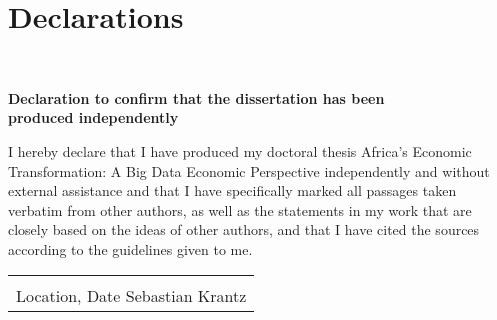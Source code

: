 \documentclass[openany]{book}
\begin{document}
%
%
%
%
%
%
%
%
%
%
%
%
%
%


\newpage
\chapter[Declarations]{Declarations}
\thispagestyle{empty}
\newpage
\hphantom{a}\\ \vspace{4cm}


{\selectfont
{\LARGE\noindent\textbf{Declaration to confirm that the dissertation has been\\[0.3em]produced independently} }
} \\ \vspace{1cm}


\vspace{1cm}
\noindent 
I hereby declare that I have produced my doctoral thesis \glqq Africa's Economic Transformation: A Big Data Economic Perspective\grqq{} independently and without external assistance and that I have specifically marked all passages taken verbatim from other authors, as well as the statements in my work that are closely based on the ideas of other authors, and that I have cited the sources according to the guidelines given to me.

\vspace{2cm}

\begin{raggedright}
\begin{tabular}{@{}p{3.5in}@{}}
\hrulefill \\
Location, Date \hspace{2cm} Sebastian Krantz
\end{tabular}
\end{raggedright}
\end{document}
